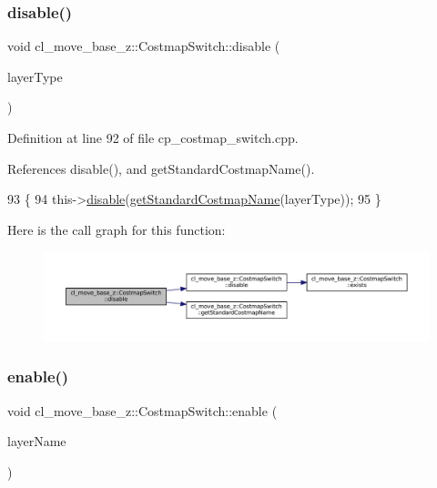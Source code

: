 \subsubsection{\texorpdfstring{disable()}{disable()}\hspace{0.1cm}{\footnotesize\ttfamily [2/2]}}
{\footnotesize\ttfamily void cl\+\_\+move\+\_\+base\+\_\+z\+::\+Costmap\+Switch\+::disable (\begin{DoxyParamCaption}\item[{\hyperlink{classcl__move__base__z_1_1CostmapSwitch_af38aeee5e3893e689cd74ddddfe0df15}{Standard\+Layers}}]{layer\+Type }\end{DoxyParamCaption})}



Definition at line 92 of file cp\+\_\+costmap\+\_\+switch.\+cpp.



References disable(), and get\+Standard\+Costmap\+Name().


\begin{DoxyCode}
93 \{
94     this->\hyperlink{classcl__move__base__z_1_1CostmapSwitch_af7cc8007da601736b445c051a6fbd49a}{disable}(\hyperlink{classcl__move__base__z_1_1CostmapSwitch_ac46796874242fdaa7efef86b66a55102}{getStandardCostmapName}(layerType));
95 \}
\end{DoxyCode}
Here is the call graph for this function\+:
\nopagebreak
\begin{figure}[H]
\begin{center}
\leavevmode
\includegraphics[width=350pt]{classcl__move__base__z_1_1CostmapSwitch_a37bfce155e049637d8444bb901c880af_cgraph}
\end{center}
\end{figure}
\mbox{\label{classcl__move__base__z_1_1CostmapSwitch_ad2366ec89f6cb922b6d4a6c8d2627e97}} 
\subsubsection{\texorpdfstring{enable()}{enable()}\hspace{0.1cm}{\footnotesize\ttfamily [1/2]}}
{\footnotesize\ttfamily void cl\+\_\+move\+\_\+base\+\_\+z\+::\+Costmap\+Switch\+::enable (\begin{DoxyParamCaption}\item[{std\+::string}]{layer\+Name }\end{DoxyParamCaption})}



